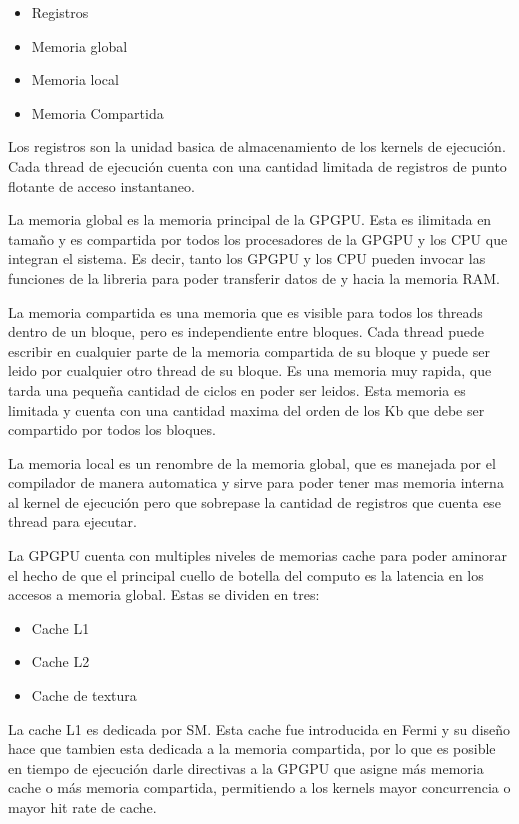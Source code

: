 \begin{itemize}
  \item Registros
  \item Memoria global
  \item Memoria local
  \item Memoria Compartida
\end{itemize}

Los registros son la unidad basica de almacenamiento de los kernels de ejecuci\'on.
Cada thread de ejecuci\'on cuenta con una cantidad limitada de registros de punto flotante de
acceso instantaneo.

La memoria global es la memoria principal de la GPGPU. Esta es ilimitada en tama\~no
y es compartida por todos los procesadores de la GPGPU y los CPU que integran el
sistema. Es decir, tanto los GPGPU y los CPU pueden invocar las funciones de la libreria
para poder transferir datos de y hacia la memoria RAM.

La memoria compartida es una memoria que es visible para todos los threads dentro
de un bloque, pero es independiente entre bloques. Cada thread puede escribir en cualquier
parte de la memoria compartida de su bloque y puede ser leido por cualquier otro thread
de su bloque. Es una memoria muy rapida, que tarda una peque\~na cantidad de ciclos
en poder ser leidos. Esta memoria es limitada y cuenta con una cantidad maxima del orden de los
Kb que debe ser compartido por todos los bloques.

La memoria local es un renombre de la memoria global, que es manejada por el compilador
de manera automatica y sirve para poder tener mas memoria interna al kernel de ejecuci\'on
pero que sobrepase la cantidad de registros que cuenta ese thread para ejecutar.

La GPGPU cuenta con multiples niveles de memorias cache para poder aminorar el hecho
de que el principal cuello de botella del computo es la latencia en los accesos a memoria
global. Estas se dividen en tres:

\begin{itemize}
  \item Cache L1
  \item Cache L2
  \item Cache de textura
\end{itemize}

La cache L1 es dedicada por SM. Esta cache fue introducida en Fermi y su dise\~no hace que
tambien esta dedicada a la memoria compartida, por lo que es posible en tiempo de ejecuci\'on
darle directivas a la GPGPU que asigne m\'as memoria cache o m\'as memoria compartida,
permitiendo a los kernels mayor concurrencia o mayor hit rate de cache.

